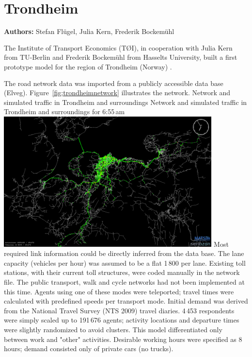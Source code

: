\section{Trondheim}
\label{sec:trondheim}
\hfill \textbf{Authors:} Stefan Flügel, Julia Kern, Frederik Bockemühl


The Institute of Transport Economics (TØI), in cooperation with Julia Kern from TU-Berlin and Frederik Bockemühl from Hasselts University, built a first prototype model for the region of Trondheim (Norway) \citep[][]{FluegelKern_unpub_WTS_2014}.

The road network data was imported from a publicly accessible data base (Elveg). Figure~\ref{fig;trondheimnetwork} illustrates the network. 
%
\createfigure%
{Network and simulated traffic in Trondheim and surroundings}%
{Network and simulated traffic in Trondheim and surroundings for 6:55\,am \citep[source][]{FluegelEtAl_Samferdsel_2014}}%
{\label{fig:trondheimnetwork}}%
{\includegraphics[width=0.85\textwidth, angle=0]{./using/figures/trondheimnetwork.png}}%
{}
%
Most required link information could be directly inferred from the data base. The lane capacity (vehicles per hour) was assumed to be a flat 1\,800 per lane. Existing toll stations, with their current toll structures, were coded manually in the network file. The public transport, walk and cycle networks had not been implemented at this time. Agents using one of these modes were teleported; travel times were calculated with predefined speeds per transport mode. 
Initial demand was derived from the National Travel Survey (NTS 2009) travel diaries. 4\,453 respondents were simply scaled up to 191\,676 agents; activity locations and departure times were slightly randomized to avoid clusters. This model differentiated only between work and "other" activities. Desirable working hours were specified as 8\,hours; demand consisted only of private cars (no trucks). 

